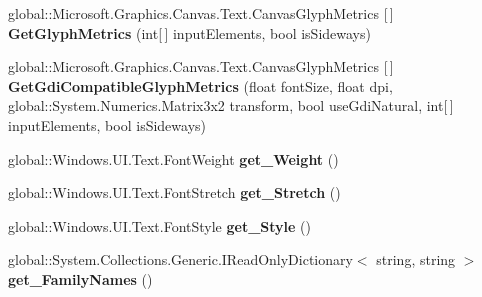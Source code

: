 \begin{DoxyCompactItemize}
\item 
\mbox{\label{class_microsoft_1_1_graphics_1_1_canvas_1_1_text_1_1_canvas_font_face_a95efbe626a205b8c52231115d87a0503}} 
global\+::\+Microsoft.\+Graphics.\+Canvas.\+Text.\+Canvas\+Glyph\+Metrics \mbox{[}$\,$\mbox{]} {\bfseries Get\+Glyph\+Metrics} (int\mbox{[}$\,$\mbox{]} input\+Elements, bool is\+Sideways)
\item 
\mbox{\label{class_microsoft_1_1_graphics_1_1_canvas_1_1_text_1_1_canvas_font_face_a1b05acf54fbdfa65595101a674ac91e1}} 
global\+::\+Microsoft.\+Graphics.\+Canvas.\+Text.\+Canvas\+Glyph\+Metrics \mbox{[}$\,$\mbox{]} {\bfseries Get\+Gdi\+Compatible\+Glyph\+Metrics} (float font\+Size, float dpi, global\+::\+System.\+Numerics.\+Matrix3x2 transform, bool use\+Gdi\+Natural, int\mbox{[}$\,$\mbox{]} input\+Elements, bool is\+Sideways)
\item 
\mbox{\label{class_microsoft_1_1_graphics_1_1_canvas_1_1_text_1_1_canvas_font_face_a3dbdf29754774dbe205e03e259a56b5d}} 
global\+::\+Windows.\+U\+I.\+Text.\+Font\+Weight {\bfseries get\+\_\+\+Weight} ()
\item 
\mbox{\label{class_microsoft_1_1_graphics_1_1_canvas_1_1_text_1_1_canvas_font_face_afc817833624035a09fff8a257d78d128}} 
global\+::\+Windows.\+U\+I.\+Text.\+Font\+Stretch {\bfseries get\+\_\+\+Stretch} ()
\item 
\mbox{\label{class_microsoft_1_1_graphics_1_1_canvas_1_1_text_1_1_canvas_font_face_a0b4496612ddddab6cfa3a98eb00e5ba6}} 
global\+::\+Windows.\+U\+I.\+Text.\+Font\+Style {\bfseries get\+\_\+\+Style} ()
\item 
\mbox{\label{class_microsoft_1_1_graphics_1_1_canvas_1_1_text_1_1_canvas_font_face_a62fb160f2223f3cc2c7cbcfa07253e25}} 
global\+::\+System.\+Collections.\+Generic.\+I\+Read\+Only\+Dictionary$<$ string, string $>$ {\bfseries get\+\_\+\+Family\+Names} ()
\item 

\end{DoxyCompactItemize}
